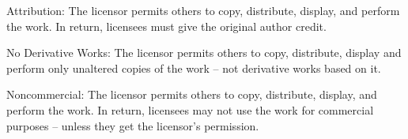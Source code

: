 \documentclass[a4paper,11pt]{book}
\begin{document}
\noindent 

\noindent Attribution: The licensor permits others to copy, distribute, display, and perform the work. In return, licensees must give the original author credit.

\noindent 

\noindent No  Derivative  Works: The licensor permits others to copy, distribute, display and perform only unaltered copies of the work -- not derivative works based on it.

\noindent 

\noindent Noncommercial: The licensor permits others to copy, distribute, display, and perform the work. In return, licensees may not use the work for commercial purposes -- unless they get the licensor's permission.
\end{document}
